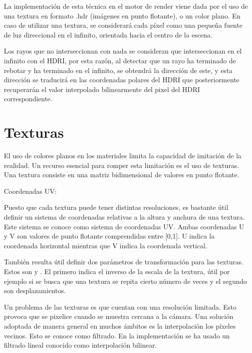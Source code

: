 \begin{itemize}
	La implementación de esta técnica en el motor de render viene dada por el uso de una textura en formato .hdr (imágenes en punto flotante), o un color plano. En caso de utilizar una textura, se considerará cada píxel como una pequeña fuente de luz direccional en el infinito, orientada hacia el centro de la escena. 

	Los rayos que no interseccionan con nada se consideran que interseccionan en el infinito con el HDRI, por esta razón, al detectar que un rayo ha terminado de rebotar y ha terminado en el infinito, se obtendrá la dirección de este, y esta dirección se traducirá en las coordenadas polares del HDRI que posteriormente recuperarán el valor interpolado bilinearmente del pixel del HDRI correspondiente.

\end{itemize}

	\section{Texturas}
	
	El uso de colores planos en los materiales limita la capacidad de imitación de la realidad. Un recurso esencial para romper esta limitación es el uso de texturas. Una textura consiste en una matriz bidimensional de valores en punto flotante.

	
	
	Coordenadas UV:

	Puesto que cada textura puede tener distintas resoluciones, es bastante útil definir un sistema de coordenadas relativas a la altura y anchura de una textura. Este sistema se conoce como sistema de coordenadas UV. Ambas coordenadas U y V son valores de punto flotante comprendidas entre [0,1]. U indica la coordenada horizontal mientras que V indica la coordenada vertical.

	También resulta útil definir dos parámetros de transformación para las texturas. Estos son  y . El primero indica el inverso de la escala de la textura, útil por ejemplo si se busca que una textura se repita cierto número de veces y el segundo son desplazamientos.

	Un problema de las texturas es que cuentan con una resolución limitada. Esto provoca que se pixelice cuando se muestra cercana a la cámara. Una solución adoptada de manera general en muchos ámbitos es la interpolación los píxeles vecinos. Esto se conoce como filtrado. En la implementación se ha usado un filtrado lineal conocido como interpolación bilinear.


